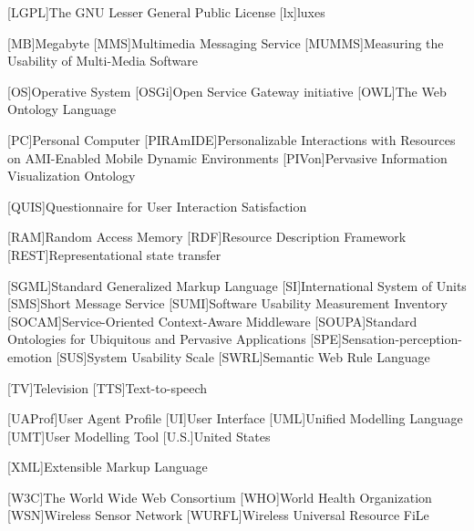 \begin{acronym}[dynui]
  [LGPL]{The GNU Lesser General Public License}
  [lx]{luxes}
  
  [MB]{Megabyte}
  [MMS]{Multimedia Messaging Service}
  [MUMMS]{Measuring the Usability of Multi-Media Software}
  
  [OS]{Operative System}
  [OSGi]{Open Service Gateway initiative}
  [OWL]{The Web Ontology Language}
  
  [PC]{Personal Computer}
  [PIRAmIDE]{Personalizable Interactions with Resources on AMI-Enabled Mobile Dynamic Environments}
  [PIVon]{Pervasive Information Visualization Ontology}
  
  [QUIS]{Questionnaire for User Interaction Satisfaction}
  
  [RAM]{Random Access Memory}
  [RDF]{Resource Description Framework}
  [REST]{Representational state transfer}
  
  [SGML]{Standard Generalized Markup Language}
  [SI]{International System of Units}
  [SMS]{Short Message Service}
  [SUMI]{Software Usability Measurement Inventory}
  [SOCAM]{Service-Oriented Context-Aware Middleware}
  [SOUPA]{Standard Ontologies for Ubiquitous and Pervasive Applications}
  [SPE]{Sensation-perception-emotion}
  [SUS]{System Usability Scale}
  [SWRL]{Semantic Web Rule Language}
  
  [TV]{Television}
  [TTS]{Text-to-speech}
  
  [UAProf]{User Agent Profile}
  [UI]{User Interface} %
  [UML]{Unified Modelling Language}
  [UMT]{User Modelling Tool}
  [U.S.]{United States}
  
  [XML]{Extensible Markup Language}
  
  [W3C]{The World Wide Web Consortium}
  [WHO]{World Health Organization}
  [WSN]{Wireless Sensor Network}
  [WURFL]{Wireless Universal Resource FiLe}

\end{acronym}
